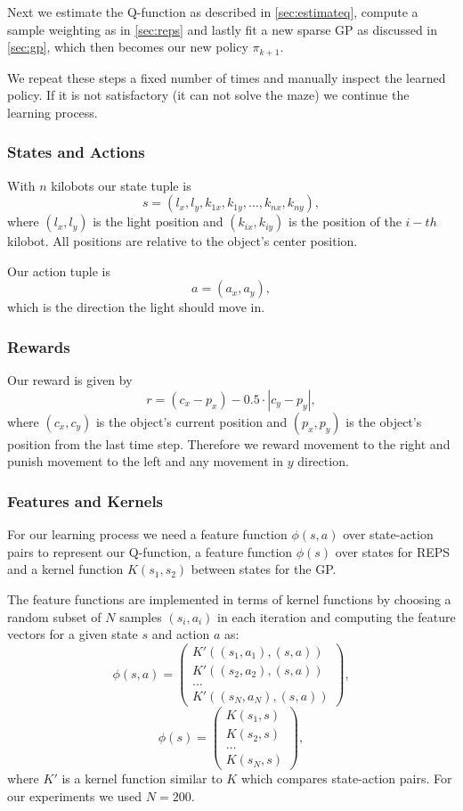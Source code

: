 \documentclass[twoside]{article}
\begin{document}
Next we estimate the Q-function as described in \ref{sec:estimateq},
compute a sample weighting as in \ref{sec:reps} and lastly fit a new sparse
GP as discussed in \ref{sec:gp}, which then becomes our new policy $\pi_{k+1}$.

We repeat these steps a fixed number of times and manually inspect the learned
policy. If it is not satisfactory (it can not solve the maze) we continue the
learning process.

\subsubsection{States and Actions}

With $n$ kilobots our state tuple is
$$s = (l_x, l_y, k_{1x}, k_{1y}, \dots, k_{nx}, k_{ny}), $$
where $(l_x, l_y)$ is the light position and $(k_{ix}, k_{iy})$ is the position
of the $i-th$ kilobot. All positions are relative to the object's center
position.

Our action tuple is
$$a = (a_x, a_y),$$
which is the direction the light should move in.

\subsubsection{Rewards}

Our reward is given by
$$ r = (c_x - p_x) - 0.5 \cdot |c_y - p_y|, $$
where $(c_x, c_y)$ is the object's current position and $(p_x, p_y)$ is the
object's position from the last time step. Therefore we reward movement to the
right and punish movement to the left and any movement in $y$ direction.

\subsubsection{Features and Kernels}

For our learning process we need a feature function $\phi(s, a)$ over
state-action pairs to represent our Q-function, a feature function $\phi(s)$
over states for REPS and a kernel function $K(s_1, s_2)$ between states for the
GP.

The feature functions are implemented in terms of kernel functions by
choosing a random subset of $N$ samples $(s_i, a_i)$ in each iteration and
computing the feature vectors for a given state $s$ and action $a$ as:
$$
\phi(s, a) = \left(
\begin{array}{c}
    K'((s_1, a_1), (s, a)) \\
    K'((s_2, a_2), (s, a)) \\
    \dots \\
    K'((s_N, a_N), (s, a))
\end{array} \right),
$$
$$
\phi(s) = \left(
\begin{array}{c}
    K(s_1, s) \\
    K(s_2, s) \\
    \dots \\
    K(s_N, s)
\end{array} \right),
$$
where $K'$ is a kernel function similar to $K$ which compares state-action
pairs. For our experiments we used $N = 200$.
\end{document}
